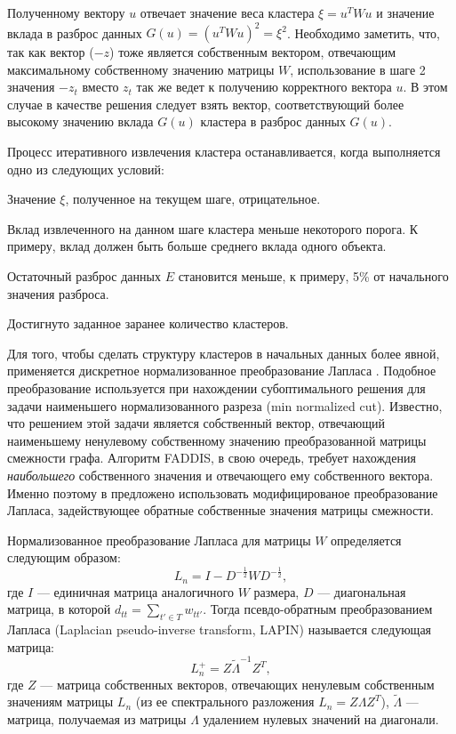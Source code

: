 \documentclass[12pt]{article}
\newenvironment{enumerate*}%
{\begin{enumerate}%
	\setlength{\itemsep}{0pt}%
	\setlength{\parskip}{0pt}}%
{\end{enumerate}}
\begin{document}
Полученному вектору $u$ отвечает значение веса кластера $\xi=u^TWu$ и значение вклада в разброс данных $G(u)=(u^TWu)^2=\xi^2$. Необходимо заметить, что, так как вектор ($-z$) тоже является собственным вектором, отвечающим максимальному собственному значению матрицы $W$, использование в шаге 2 значения $-z_t$ вместо $z_t$ так же ведет к получению корректного вектора $u$. В этом случае в качестве решения следует взять вектор, соответствующий более высокому значению вклада $G(u)$ кластера в разброс данных $G(u)$.

Процесс итеративного извлечения кластера останавливается, когда выполняется одно из следующих условий:
\begin{enumerate*}
	\item\label{enum:faddis_stop_xi_neg} Значение $\xi$, полученное на текущем шаге, отрицательное.
	\item Вклад извлеченного на данном шаге кластера меньше некоторого порога. К примеру, вклад должен быть больше среднего вклада одного объекта.
	\item Остаточный разброс данных $E$ становится меньше, к примеру, 5\% от начального значения разброса.
	\item Достигнуто заданное заранее количество кластеров.
\end{enumerate*}

Для того, чтобы сделать структуру кластеров в начальных данных более явной, применяется дискретное нормализованное преобразование Лапласа \cite{von2007tutorial}. Подобное преобразование используется при нахождении субоптимального решения для задачи наименьшего нормализованного разреза (min normalized cut). Известно, что решением этой задачи является собственный вектор, отвечающий наименьшему ненулевому собственному значению преобразованной матрицы смежности графа. Алгоритм FADDIS, в свою очередь, требует нахождения \emph{наибольшего} собственного значения и отвечающего ему собственного вектора. Именно поэтому в \cite{mirkin2012additive} предложено использовать модифицированое преобразование Лапласа, задействующее обратные собственные значения матрицы смежности. 

Нормализованное преобразование Лапласа для матрицы $W$ определяется следующим образом:
\begin{equation}
	L_n=I-D^{-\frac{1}{2}}WD^{-\frac{1}{2}}, 
\end{equation}
где $I$ --- единичная матрица аналогичного $W$ размера, $D$ --- диагональная матрица, в которой $d_{tt} =\sum_{t'\in T} w_{tt'}$. 
Тогда псевдо-обратным преобразованием Лапласа (Laplacian pseudo-inverse transform, LAPIN) \cite{nascimento2013laplacian} называется следующая матрица:
\begin{equation}
	L_n^+ = Z \tilde{\Lambda}^{-1} Z^T,
\end{equation}
где $Z$ --- матрица собственных векторов, отвечающих ненулевым собственным значениям матрицы $L_n$ (из ее спектрального разложения $L_n=Z\Lambda Z^T$), $\tilde{\Lambda}$ --- матрица, получаемая из матрицы $\Lambda$ удалением нулевых значений на диагонали.
\end{document}
